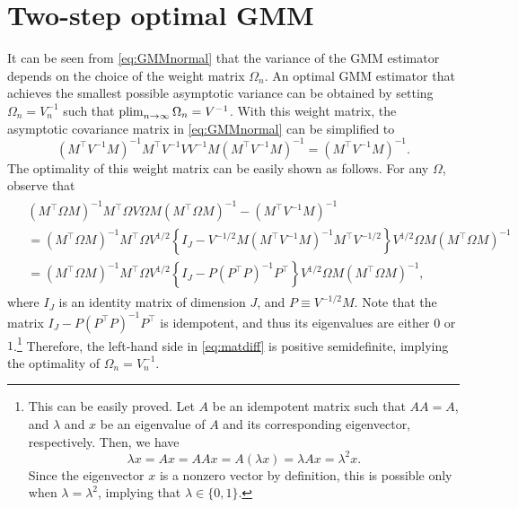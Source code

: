 \documentclass[11pt, A4paper, openany, uplatex]{book}
\begin{document}
\section{Two-step optimal GMM}
It can be seen from \eqref{eq:GMMnormal} that the variance of the GMM estimator depends on the choice of the weight matrix $\Omega_n$.
An optimal GMM estimator that achieves the smallest possible asymptotic variance can be obtained by setting $\Omega_n = V_n^{-1}$ such that $\operatorname*{plim}_{n \to \infty} \Omega_n = V^{-1}$.
With this weight matrix, the asymptotic covariance matrix in \eqref{eq:GMMnormal} can be simplified to
\[
	(M^\top V^{-1} M )^{-1} M^\top V^{-1} V V^{-1} M ( M^\top V^{-1} M )^{-1} =  (M^\top V^{-1} M )^{-1}.
\]
The optimality of this weight matrix can be easily shown as follows.
For any $\Omega$, observe that
\begin{align}\label{eq:matdiff}
\begin{split}
	&  (M^\top \Omega M )^{-1} M^\top \Omega V \Omega M ( M^\top \Omega M )^{-1}   - (M^\top V^{-1} M )^{-1} \\
	& =  (M^\top \Omega M )^{-1} M^\top \Omega V^{1/2}\left\{ I_J -  V^{-1/2}M ( M^\top V^{-1} M )^{-1} M^\top V^{-1/2} \right\} V^{1/2} \Omega M  (M^\top \Omega M )^{-1} \\
	& =   (M^\top \Omega M )^{-1} M^\top \Omega V^{1/2} \left\{ I_J - P (P^\top P)^{-1} P^\top \right\}  V^{1/2} \Omega M  (M^\top \Omega M )^{-1},
\end{split}
\end{align}
where $I_J$ is an identity matrix of dimension $J$, and $P \equiv V^{-1/2}M$.
Note that the matrix $ I_J - P (P^\top P)^{-1} P^\top$ is idempotent, and thus its eigenvalues are either $0$ or $1$.\footnote{
	This can be easily proved.
	Let $A$ be an idempotent matrix such that $AA = A$, and $\lambda$ and $x$ be an eigenvalue of $A$ and its corresponding eigenvector, respectively.
	Then, we have
	\[
	\lambda x = Ax = AAx = A(\lambda x) = \lambda Ax = \lambda^2 x.
	\]
	Since the eigenvector $x$ is a nonzero vector by definition, this is possible only when $\lambda = \lambda^2$, implying that $\lambda \in \{0,1\}$.
	}
Therefore, the left-hand side in \eqref{eq:matdiff} is positive semidefinite, implying the optimality of  $\Omega_n = V_n^{-1}$.
\end{document}
